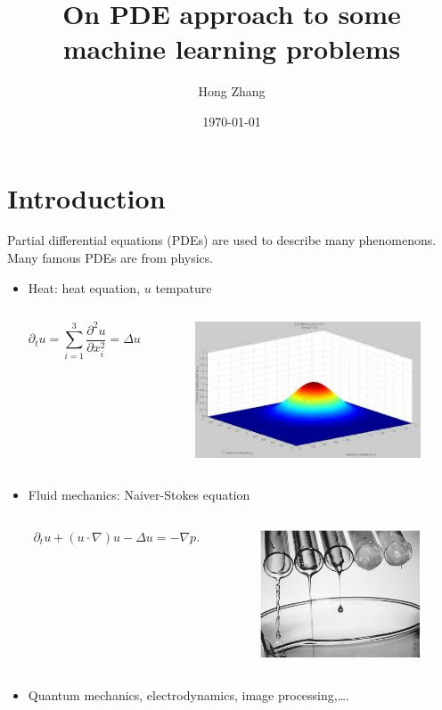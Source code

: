 \documentclass{beamer}
\title[prediction and learning]{On PDE approach to some machine learning problems} %
\author{Hong Zhang} %
\institute[Brown University] %
{
Applied Math, Brown University \\ %
\medskip
}
\date{\today} %
\begin{document}
\begin{frame}
\titlepage
\end{frame}
\begin{frame}
\tableofcontents
\end{frame}

\section{Introduction}

\begin{frame}
Partial differential equations (PDEs) are used to describe many phenomenons.  Many famous PDEs are from physics.
\begin{itemize}
\item Heat: heat equation, $u$ tempature
\begin{columns}
\begin{equation*}
\partial_t u = \sum_{i=1}^3\frac{\partial^2 u }{\partial x_i^2} = \Delta u
\end{equation*}
\begin{figure}
\includegraphics[scale = 0.3]{heatdiffusion}
\end{figure}
\end{columns}
\pause
\item Fluid mechanics: Naiver-Stokes equation
\begin{columns}
\begin{align*}
\partial_t u + (u\cdot\nabla)u - \Delta u = -\nabla p.
\end{align*}
\begin{figure}
\includegraphics[scale = 0.25]{viscosflow}
\end{figure}
\end{columns}
\pause
\item Quantum mechanics, electrodynamics, image processing,\ldots.
\end{itemize} 


\end{frame}
\end{document}
